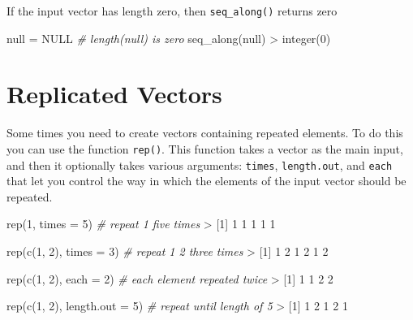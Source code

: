 \documentclass[
]{book}
\newenvironment{Shaded}{\begin{snugshade}}{\end{snugshade}}
\newcommand{\AttributeTok}[1]{\textcolor[rgb]{0.77,0.63,0.00}{#1}}
\newcommand{\CommentTok}[1]{\textcolor[rgb]{0.56,0.35,0.01}{\textit{#1}}}
\newcommand{\ConstantTok}[1]{\textcolor[rgb]{0.00,0.00,0.00}{#1}}
\newcommand{\DecValTok}[1]{\textcolor[rgb]{0.00,0.00,0.81}{#1}}
\newcommand{\FunctionTok}[1]{\textcolor[rgb]{0.00,0.00,0.00}{#1}}
\newcommand{\NormalTok}[1]{#1}
\newcommand{\OtherTok}[1]{\textcolor[rgb]{0.56,0.35,0.01}{#1}}
\newcommand{\SpecialCharTok}[1]{\textcolor[rgb]{0.00,0.00,0.00}{#1}}
\begin{document}
If the input vector has length zero, then \texttt{seq\_along()} returns zero

\begin{Shaded}
\begin{Highlighting}[]
\NormalTok{null }\OtherTok{=} \ConstantTok{NULL}  \CommentTok{\# length(null) is zero}
\FunctionTok{seq\_along}\NormalTok{(null)}
\SpecialCharTok{\textgreater{}} \FunctionTok{integer}\NormalTok{(}\DecValTok{0}\NormalTok{)}
\end{Highlighting}
\end{Shaded}

\hypertarget{replicated-vectors}{%
\section{Replicated Vectors}\label{replicated-vectors}}

Some times you need to create vectors containing repeated elements. To do this
you can use the function \texttt{rep()}. This function takes a vector as the main
input, and then it optionally takes various arguments: \texttt{times}, \texttt{length.out},
and \texttt{each} that let you control the way in which the elements of the input
vector should be repeated.

\begin{Shaded}
\begin{Highlighting}[]
\FunctionTok{rep}\NormalTok{(}\DecValTok{1}\NormalTok{, }\AttributeTok{times =} \DecValTok{5}\NormalTok{)        }\CommentTok{\# repeat 1 five times}
\SpecialCharTok{\textgreater{}}\NormalTok{ [}\DecValTok{1}\NormalTok{] }\DecValTok{1} \DecValTok{1} \DecValTok{1} \DecValTok{1} \DecValTok{1}

\FunctionTok{rep}\NormalTok{(}\FunctionTok{c}\NormalTok{(}\DecValTok{1}\NormalTok{, }\DecValTok{2}\NormalTok{), }\AttributeTok{times =} \DecValTok{3}\NormalTok{)  }\CommentTok{\# repeat 1 2 three times}
\SpecialCharTok{\textgreater{}}\NormalTok{ [}\DecValTok{1}\NormalTok{] }\DecValTok{1} \DecValTok{2} \DecValTok{1} \DecValTok{2} \DecValTok{1} \DecValTok{2}

\FunctionTok{rep}\NormalTok{(}\FunctionTok{c}\NormalTok{(}\DecValTok{1}\NormalTok{, }\DecValTok{2}\NormalTok{), }\AttributeTok{each =} \DecValTok{2}\NormalTok{)   }\CommentTok{\# each element repeated twice}
\SpecialCharTok{\textgreater{}}\NormalTok{ [}\DecValTok{1}\NormalTok{] }\DecValTok{1} \DecValTok{1} \DecValTok{2} \DecValTok{2}

\FunctionTok{rep}\NormalTok{(}\FunctionTok{c}\NormalTok{(}\DecValTok{1}\NormalTok{, }\DecValTok{2}\NormalTok{), }\AttributeTok{length.out =} \DecValTok{5}\NormalTok{)  }\CommentTok{\# repeat until length of 5}
\SpecialCharTok{\textgreater{}}\NormalTok{ [}\DecValTok{1}\NormalTok{] }\DecValTok{1} \DecValTok{2} \DecValTok{1} \DecValTok{2} \DecValTok{1}
\end{Highlighting}
\end{Shaded}
\end{document}
